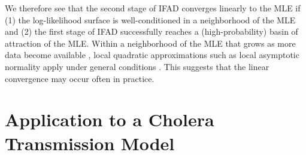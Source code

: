 \documentclass[numsec,webpdf,modern,medium,namedate]{oup-authoring-template}
\theoremstyle{thmstyleone}%
\theoremstyle{thmstyletwo}%
\theoremstyle{thmstylethree}%
\begin{document}
We therefore see that the second stage of IFAD converges linearly to the MLE if (1) the log-likelihood surface is well-conditioned in a neighborhood of the MLE and (2) the first stage of IFAD successfully reaches a (high-probability) basin of attraction of the MLE.
Within a neighborhood of the MLE that grows as more data become available \citep{ning21}, local quadratic approximations such as local asymptotic normality apply under general conditions \citep{lecam00}.
This suggests that the linear convergence may occur often in practice.







\section{Application to a Cholera Transmission Model}
\label{sec:cholera}
\end{document}
